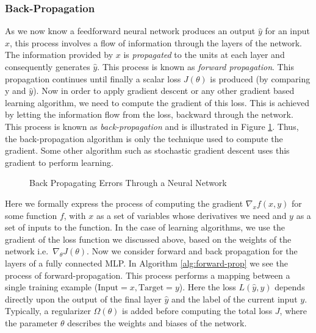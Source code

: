 \documentclass[12pt]{extarticle}
\numberwithin{equation}{section}
\begin{document}
	\subsubsection{Back-Propagation}	
	As we now know a feedforward neural network produces an output $\hat{y}$ for an input $x$, this process involves a flow of information through the layers of the network. The information provided by $x$ is \textit{propagated} to the units at each layer and consequently generates $\hat{y}$. This process is known as \textit{forward propagation}. This propagation continues until finally a scalar loss $J(\theta)$ is produced (by comparing y and $ \hat{y}$). Now in order to apply gradient descent or any other gradient based learning algorithm, we need to compute the gradient of this loss. This is achieved by letting the information flow from the loss, backward through the network. This process is known as \textit{back-propagation}\cite{rumelhart1986learning} and is illustrated in Figure \ref{back_prop}. Thus, the back-propagation algorithm is only the technique used to compute the gradient. Some other algorithm such as stochastic gradient descent uses this gradient to perform learning. 
	\begin{figure}[H]
		\centering
		\setlength{\fboxsep}{5pt}%
		\setlength{\fboxrule}{1pt}%
		\caption{Back Propagating Errors Through a Neural Network
			\label{back_prop}}
	\end{figure}
	Here we formally express the process of computing the gradient $\nabla_{x}f(x,y)$ for some function $f$, with $x$ as a set of variables whose derivatives we need and $y$ as a set of inputs to the function. In the case of learning algorithms, we use the gradient of the loss function we discussed above, based on the weights of the network i.e.\ $\nabla_{\theta}J(\theta)$.
Now we consider forward and back propagation for the layers of a fully connected MLP. In Algorithm \ref{alg:forward-prop} we see the process of forward-propagation. This process performs a mapping between a single training example ($\text{Input}=x, \text{Target}=y$). Here the loss $L(\hat{y},y)$ depends directly upon the output of the final layer $\hat{y}$ and the label of the current input $y$. Typically, a regularizer $\Omega(\theta)$ is added before computing the total loss $J$, where the parameter $\theta$ describes the weights and biases of the network.
\end{document}

